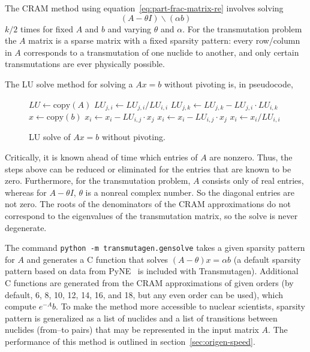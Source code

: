 The CRAM method using equation~\ref{eq:part-frac-matrix-re} involves solving
\begin{equation}
 (A - \theta I)\backslash(\alpha b)
\end{equation}
$k/2$ times for fixed $A$ and $b$ and varying $\theta$ and $\alpha$. For the
transmutation problem the $A$ matrix is a sparse matrix with a fixed sparsity
pattern: every row/column in $A$ corresponds to a transmutation of one nuclide
to another, and only certain transmutations are ever physically possible.

The LU solve method for solving a $Ax=b$ without pivoting is, in pseudocode,

\begin{figure}
  \caption{LU solve of $Ax=b$ without pivoting.}\label{lu-pseudocode}
  \begin{algorithmic}
  \STATE {}
  \STATE {}
  \STATE
  \STATE $LU \leftarrow \mathrm{copy}(A)$
  \STATE
        \STATE $LU_{j, i} \leftarrow LU_{j, i}/LU_{i, i}$
    \ENDFOR
  \ENDFOR
  \STATE
    \STATE $LU_{j, k} \leftarrow LU_{j, k} - LU_{j, i}\cdot LU_{i, k}$
  \ENDFOR
  \STATE
  \STATE {}
  \STATE $x \leftarrow \mathrm{copy}(b)$
  \STATE
  \STATE {}
          \STATE $x_i \leftarrow x_i - LU_{i, j}\cdot x_j$
      \ENDFOR
  \ENDFOR
  \STATE
  \STATE {}
          \STATE $x_i \leftarrow x_i -LU_{i, j}\cdot x_j$
      \ENDFOR
      \STATE $x_i \leftarrow x_i/LU_{i, i}$
  \ENDFOR

\end{algorithmic}
\end{figure}

Critically, it is known ahead of time which entries of $A$ are nonzero. Thus,
the steps above can be reduced or eliminated for the entries that are known to
be zero. Furthermore, for the transmutation problem, $A$ consists only of real
entries, whereas for $A - \theta I$, $\theta$ is a nonreal complex number. So
the diagonal entries are not zero. The roots of the denominators of the CRAM
approximations do not correspond to the eigenvalues of the transmutation
matrix, so the solve is never degenerate.

The command \texttt{python -m transmutagen.gensolve} takes a given sparsity
pattern for $A$ and generates a C function that solves
$(A - \theta)x =\alpha b$ (a default sparsity pattern based on data from
PyNE~\cite{ationneeded} is included with Transmutagen). Additional C functions
are generated from the CRAM approximations of given orders (by default, 6, 8,
10, 12, 14, 16, and 18, but any even order can be used), which compute
$e^{-A}b$. To make the method more accessible to nuclear scientists, sparsity
pattern is generalized as a list of nuclides and a list of transitions between
nuclides (from--to pairs) that may be represented in the input matrix $A$. The
performance of this method is outlined in section~\ref{sec:origen-speed}.
